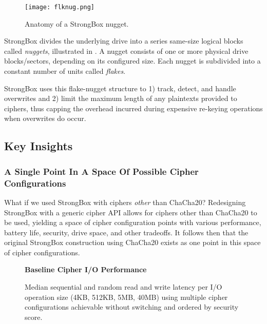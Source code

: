 \begin{figure}[ht]
   \centering
   \texttt{[image: flknug.png]}
   \caption{Anatomy of a StrongBox nugget.}\label{fig:flknug}
\end{figure}

StrongBox divides the underlying drive into a series same-size logical blocks
called \emph{nuggets}, illustrated in . A nugget consists of one
or more physical drive blocks/sectors, depending on its configured size. Each
nugget is subdivided into a constant number of units called \emph{flakes}.

StrongBox uses this flake-nugget structure to 1) track, detect, and handle
overwrites and 2) limit the maximum length of any plaintexts provided to
ciphers, thus capping the overhead incurred during expensive re-keying
operations when overwrites do occur.

\subsection{Key Insights}

\subsubsection{A Single Point In A Space Of Possible Cipher Configurations}
 What if we
used StrongBox with ciphers \textit{other} than ChaCha20? Redesigning StrongBox
with a generic cipher API allows for ciphers other than ChaCha20 to be used,
yielding a space of cipher configuration points with various performance,
battery life, security, drive space, and other tradeoffs. It follows then that
the original StrongBox construction using ChaCha20 exists as one point in this
space of cipher configurations.

\begin{figure*}[ht] \textbf{Baseline Cipher I/O Performance}\par\medskip
   \centering
   {} \caption{Median sequential and random
   read and write latency per I/O operation size (4KB, 512KB, 5MB, 40MB) using
   multiple cipher configurations achievable without switching and ordered by
   security score.}
  \label{fig:tradeoff-no-ratios}
\end{figure*}

